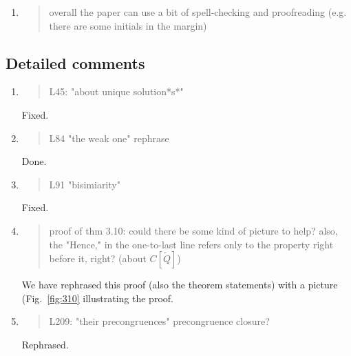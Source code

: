 \begin{enumerate}
\item \begin{quote}
    overall the paper can use a bit of spell-checking and proofreading (e.g. there are some initials in the margin)
  \end{quote}


\end{enumerate}

\subsection*{Detailed comments}

\begin{enumerate}
\item \begin{quote}
    L45: "about unique solution*s*"
  \end{quote}
  \Mark
  Fixed.
  
\item \begin{quote}
    L84 "the weak one" rephrase
  \end{quote}
  \Mark

Done. 

  
\item \begin{quote}
    L91 "bisimiarity"
  \end{quote}
  \Mark
Fixed.
  
\item \begin{quote}
    proof of thm 3.10: could there be some kind of picture to help? also, the "Hence," in the one-to-last line refers only to the property right before it, right? (about $C[\tilde{Q}]$)
  \end{quote}

  \Mark
  We have rephrased this proof (also the theorem statements) with a
  picture (Fig.~\ref{fig:310} illustrating the proof. 
  
\item \begin{quote}
    L209: "their precongruences" precongruence closure?
  \end{quote}

  \Mark
  Rephrased.



\end{enumerate}
